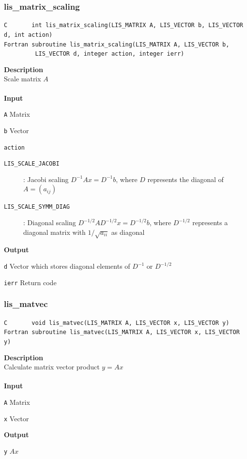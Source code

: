 \documentclass[a4paper]{article}
\newcommand{\namelistlabel}[1]{\mbox{#1}\hfill}
\newenvironment{namelist}[1]{%
 \begin{list}{}
  {\let\makelabel\namelistlabel
  \settowidth{\labelwidth}{#1}
  \setlength{\leftmargin}{1.1\labelwidth}}
}{%
\end{list}}
\begin{document}
  \subsubsection{lis\_matrix\_scaling}
\begin{screen}
\verb|C       int lis_matrix_scaling(LIS_MATRIX A, LIS_VECTOR b, LIS_VECTOR d, int action)|\\
\verb|Fortran subroutine lis_matrix_scaling(LIS_MATRIX A, LIS_VECTOR b,|\\
\verb|         LIS_VECTOR d, integer action, integer ierr)|
\end{screen}
{\bf Description}\\
\indent
Scale matrix $A$
\\ \\
\noindent
{\bf Input}
\begin{namelist}{XXXXXXXXXXXXXXXXXXXX}
\item[\tt A] Matrix
\item[\tt b] Vector
\item[\tt action] \begin{description}
\item[\tt LIS\_SCALE\_JACOBI]: Jacobi scaling $D^{-1}Ax=D^{-1}b$, where $D$
	   represents the diagonal of $A=(a_{ij})$
\item[\tt LIS\_SCALE\_SYMM\_DIAG]: Diagonal scaling
	   $D^{-1/2}AD^{-1/2}x=D^{-1/2}b$, where $D^{-1/2}$ represents
	   a diagonal matrix with $1/\sqrt{a_{ii}}$ as diagonal
\end{description}
\end{namelist}
{\bf Output}
\begin{namelist}{XXXXXXXXXXXXXXXXXXXX}
\item[\tt d]  Vector which stores diagonal elements of $D^{-1}$ or $D^{-1/2}$
\item[\tt ierr] Return code
\end{namelist}
\newpage
  \subsubsection{lis\_matvec}
\begin{screen}
\verb|C       void lis_matvec(LIS_MATRIX A, LIS_VECTOR x, LIS_VECTOR y)|\\
\verb|Fortran subroutine lis_matvec(LIS_MATRIX A, LIS_VECTOR x, LIS_VECTOR y)|
\end{screen}
{\bf Description}\\
\indent
Calculate matrix vector product $y=Ax$
\\ \\
\noindent
{\bf Input}
\begin{namelist}{XXXXXXXXXXXXXXXXXXXX}
\item[\tt A] Matrix
\item[\tt x] Vector
\end{namelist}
{\bf Output}
\begin{namelist}{XXXXXXXXXXXXXXXXXXXX}
\item[\tt y] $Ax$
\end{namelist}
\end{document}
